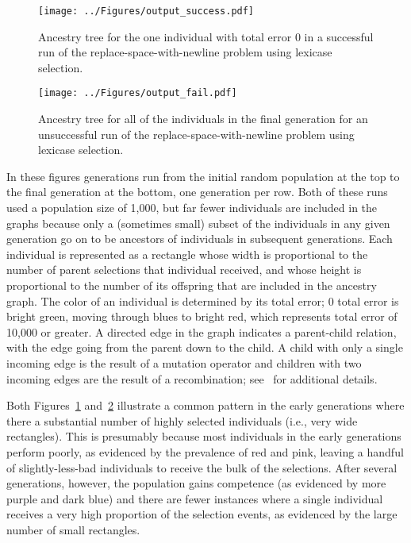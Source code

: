 \documentclass{sig-alternate}
\begin{document}
\begin{figure}[t]
	\centering
	\texttt{[image: ../Figures/output\_success.pdf]}
	\caption{Ancestry tree for the one individual with total error 0 in a successful run of the replace-space-with-newline problem using lexicase selection.}
	\label{fig:success}
\end{figure}

\begin{figure}[p]
	\centering
	\texttt{[image: ../Figures/output\_fail.pdf]}
	\caption{Ancestry tree for all of the individuals in the final generation for an unsuccessful run of the replace-space-with-newline problem using lexicase selection.}
	\label{fig:fail}
\end{figure}

In these figures generations run from the initial random population at the top to the final generation at the bottom, one generation per row. Both of these runs used a population size of 1,000, but far fewer individuals are included in the graphs because only a (sometimes small) subset of the individuals in any given generation go on to be ancestors of individuals in subsequent generations. Each individual is represented as a rectangle whose width is proportional to the number of parent selections that individual received, and whose height is proportional to the number of its offspring that are included in the ancestry graph. 
The color of an individual is determined by its total error; 0 total error is bright green, moving through blues to bright red, which represents total error of 10,000 or greater. A directed edge in the graph indicates a parent-child relation, with the edge going from the parent down to the child. A child with only a single incoming edge is the result of a mutation operator and children with two incoming edges are the result of a recombination; see~\cite{Helmuth:2015:dissertation,Spector:2013:GPTP} for additional details.

Both Figures~\ref{fig:success} and~\ref{fig:fail} illustrate a common pattern in the early generations where there a substantial number of highly selected individuals (i.e., very wide rectangles). This is presumably because most individuals in the early generations perform poorly, as evidenced by the prevalence of red and pink, leaving a handful of slightly-less-bad individuals to receive the bulk of the selections. After several generations, however, the population gains competence (as evidenced by more purple and dark blue) and there are fewer instances where a single individual receives a very high proportion of the selection events, as evidenced by the large number of small rectangles.
\end{document}
